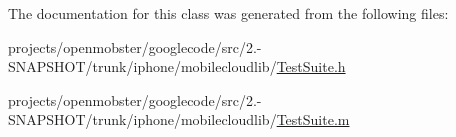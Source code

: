 \-The documentation for this class was generated from the following files\-:\begin{DoxyCompactItemize}
\item 
projects/openmobster/googlecode/src/2.-\/\-S\-N\-A\-P\-S\-H\-O\-T/trunk/iphone/mobilecloudlib/\hyperlink{_test_suite_8h}{\-Test\-Suite.\-h}\item 
projects/openmobster/googlecode/src/2.-\/\-S\-N\-A\-P\-S\-H\-O\-T/trunk/iphone/mobilecloudlib/\hyperlink{_test_suite_8m}{\-Test\-Suite.\-m}\end{DoxyCompactItemize}
